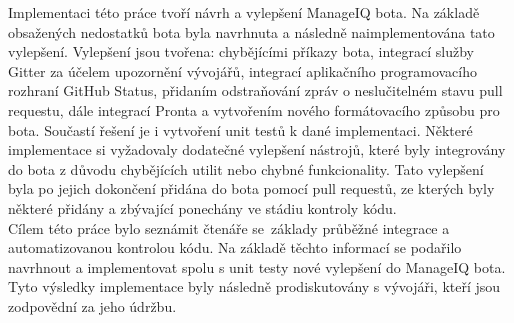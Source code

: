 \indent Implementaci této práce tvoří návrh a vylepšení ManageIQ bota. Na základě obsažených nedostatků bota byla navrhnuta a následně naimplementována tato vylepšení. Vylepšení jsou tvořena: chybějícími příkazy bota, integrací služby Gitter za účelem upozornění vývojářů, integrací aplikačního programovacího rozhraní GitHub Status, přidaním odstraňování zpráv o neslučitelném stavu pull requestu, dále integrací Pronta a vytvořením nového formátovacího způsobu pro bota. Součastí řešení je i vytvoření unit testů k dané implementaci. Některé implementace si vyžadovaly dodatečné vylepšení nástrojů, které byly integrovány do bota z důvodu chybějících utilit nebo chybné funkcionality. Tato vylepšení byla po jejich dokončení přidána do bota pomocí pull requestů, ze kterých byly některé přidány a zbývající ponechány ve stádiu kontroly kódu.\\[0.5em]
\indent Cílem této práce bylo seznámit čtenáře se~základy průběžné integrace a automatizovanou kontrolou kódu. Na základě těchto informací se podařilo navrhnout a implementovat spolu s unit testy nové vylepšení do ManageIQ bota. Tyto výsledky implementace byly následně prodiskutovány s vývojáři, kteří jsou zodpovědní za jeho údržbu.

